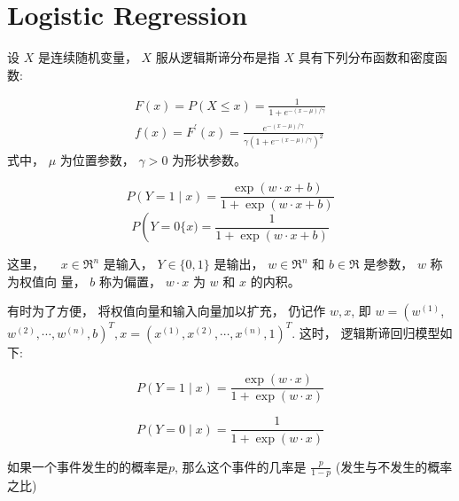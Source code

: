 \chapter{Logistic Regression}

\begin{definition}
    设 $ X $ 是连续随机变量， $ X $ 服从逻辑斯谛分布是指 $ X $ 具有下列分布函数和密度函数:

    \begin{equation}
\begin{array}{l}
F(x)=P(X \leqslant x)=\frac{1}{1+{e}^{-(x-\mu) / \gamma}} \\
f(x)=F^{\prime}(x)=\frac{{e}^{-(x-\mu) / \gamma}}{\gamma\left(1+{e}^{-(x-\mu) / \gamma}\right)^{2}}
\end{array}
\end{equation}
式中， $ \mu $ 为位置参数， $ \gamma>0 $ 为形状参数。
\end{definition}



\begin{definition}
    \begin{equation} P(Y=1 \mid x)=\frac{\exp (w \cdot x+b)}{1+\exp (w \cdot x+b)} \end{equation}
\begin{equation} P\left(Y=0\{x)=\frac{1}{1+\exp (w \cdot x+b)}\right. \end{equation}

这里， $\quad x \in \mathfrak{R}^{n}$ 是输入， $Y \in\{0,1\}$ 是输出， $w \in \mathfrak{R}^{n}$ 和 $b \in \mathfrak{R}$ 是参数， $w$ 称为权值向 量， $b$ 称为偏置， $w \cdot x$ 为 $w$ 和 $x$ 的内积。
\end{definition}

有时为了方便， 将权值向量和输入向量加以扩充， 仍记作 $ w, x $, 即 $ w=\left(w^{(1)}\right. $, $ \left.w^{(2)}, \cdots, w^{(n)}, b\right)^{{T}}, x=\left(x^{(1)}, x^{(2)}, \cdots, x^{(n)}, 1\right)^{{T}} $. 这时， 逻辑斯谛回归模型如下:

\begin{equation} P(Y=1 \mid x)=\frac{\exp (w \cdot x)}{1+\exp (w \cdot x)} \end{equation}

\begin{equation} P(Y=0 \mid x)=\frac{1}{1+\exp (w \cdot x)} \end{equation}

\begin{definition}[几率]
    如果一个事件发生的的概率是$p$, 那么这个事件的几率是 $ \frac{p}{1-p} $ (发生与不发生的概率之比)
\end{definition}

